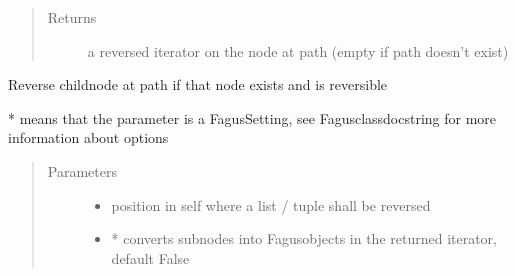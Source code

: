 \documentclass[a4paper,10pt,english]{sphinxmanual}
\begin{document}
\begin{fulllineitems}
\begin{fulllineitems}
\begin{quote}
\begin{description}
\begin{itemize}
\end{itemize}

\item[{Returns}] \leavevmode
\sphinxAtStartPar
a reversed iterator on the node at path (empty if path doesn’t exist)

\end{description}\end{quote}

\end{fulllineitems}


\begin{fulllineitems}
\label{\detokenize{fagus.fagus:fagus.fagus.Fagus.reverse}}
\pysigstartsignatures
{}
\pysigstopsignatures
\sphinxAtStartPar
Reverse child\sphinxhyphen{}node at path if that node exists and is reversible

\sphinxAtStartPar
* means that the parameter is a Fagus\sphinxhyphen{}Setting, see Fagus\sphinxhyphen{}class\sphinxhyphen{}docstring for more information about options
\begin{quote}\begin{description}
\item[{Parameters}] \leavevmode\begin{itemize}
\item {}
\sphinxAtStartPar
{} \textendash{} position in self where a list / tuple shall be reversed

\item {}
\sphinxAtStartPar
{} \textendash{} * converts sub\sphinxhyphen{}nodes into Fagus\sphinxhyphen{}objects in the returned iterator, default False


\end{itemize}
\end{description}
\end{quote}
\end{fulllineitems}
\end{fulllineitems}
\end{document}
